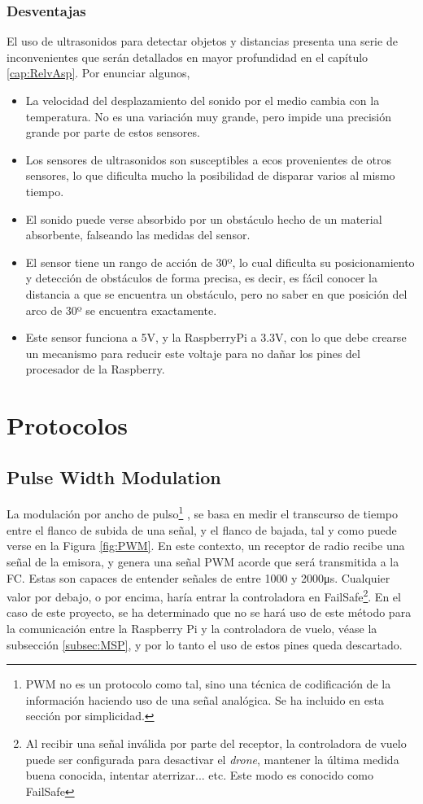 \subsubsection{Desventajas}
El uso de ultrasonidos para detectar objetos y distancias presenta una serie de inconvenientes que serán detallados en mayor profundidad en el capítulo \ref{cap:RelvAsp}. Por enunciar algunos, 
\begin{itemize}
\item La velocidad del desplazamiento del sonido por el medio cambia con la temperatura. No es una variación muy grande, pero impide una precisión grande por parte de estos sensores.
\item Los sensores de ultrasonidos son susceptibles a ecos provenientes de otros sensores, lo que dificulta mucho la posibilidad de disparar varios al mismo tiempo.
\item El sonido puede verse absorbido por un obstáculo hecho de un material absorbente, falseando las medidas del sensor.
\item El sensor tiene un rango de acción de 30º, lo cual dificulta su posicionamiento y detección de obstáculos de forma precisa, es decir, es fácil conocer la distancia a que se encuentra un obstáculo, pero no saber en que posición del arco de 30º se encuentra exactamente.
\item Este sensor funciona a 5V, y la RaspberryPi a 3.3V, con lo que debe crearse un mecanismo para reducir este voltaje para no dañar los pines del procesador de la Raspberry.
\end{itemize}


\section{Protocolos}

\subsection{Pulse Width Modulation}
\label{subsec:PWM}

La modulación por ancho de pulso\footnote{PWM no es un protocolo como tal, sino una técnica de codificación de la información haciendo uso de una señal analógica. Se ha incluido en esta sección por simplicidad.} \citep{wiki:PWM}, se basa en medir el transcurso de tiempo entre el flanco de subida de una señal, y el flanco de bajada, tal y como puede verse en la Figura \ref{fig:PWM}.
En este contexto, un receptor de radio recibe una señal de la emisora,  y genera una señal PWM acorde que será transmitida a la FC.
Estas son capaces de entender señales de entre 1000 y 2000\si{\us}. Cualquier valor por debajo, o por encima, haría entrar la controladora en FailSafe\footnote{Al recibir una señal inválida por parte del receptor, la controladora de vuelo puede ser configurada para desactivar el \emph{drone}, mantener la última medida buena conocida, intentar aterrizar... etc. Este modo es conocido como FailSafe}. 
En el caso de este proyecto, se ha determinado que no se hará uso de este método para la comunicación entre la Raspberry Pi y la controladora de vuelo, véase la subsección \ref{subsec:MSP}, y por lo tanto el uso de estos pines queda descartado.

